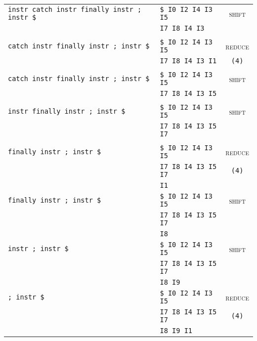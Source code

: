 \documentclass[a4paper,10pt]{article}
\begin{document}
\begin{enumerate}
\begin{enumerate}
\begin{center}
\begin{tabular}{ | l | l | c |}
                    \verb|instr catch instr finally instr ; instr $| & \verb|$ I0 I2 I4 I3 I5| & \textsc{shift} \\
                    \verb|                                          | & \verb|I7 I8 I4 I3| & \\ 
                    & & \\ \hline

                    \verb|catch instr finally instr ; instr $| & \verb|$ I0 I2 I4 I3 I5| & \textsc{reduce} \\
                    & \verb|I7 I8 I4 I3 I1| & \verb|(4)| \\ 
                    & & \\ \hline

                    \verb|catch instr finally instr ; instr $| & \verb|$ I0 I2 I4 I3 I5| & \textsc{shift} \\
                    & \verb|I7 I8 I4 I3 I5| & \\ 
                    & & \\ \hline

                    \verb|instr finally instr ; instr $| & \verb|$ I0 I2 I4 I3 I5| & \textsc{shift} \\
                    & \verb|I7 I8 I4 I3 I5 I7| & \\ 
                    & & \\ \hline

                    \verb|finally instr ; instr $| & \verb|$ I0 I2 I4 I3 I5| & \textsc{reduce} \\
                    & \verb|I7 I8 I4 I3 I5 I7| & \verb|(4)| \\
                    & \verb|I1| & \\ \hline

                    \verb|finally instr ; instr $| & \verb|$ I0 I2 I4 I3 I5| & \textsc{shift} \\
                    & \verb|I7 I8 I4 I3 I5 I7| & \\
                    & \verb|I8| & \\ \hline

                    \verb|instr ; instr $| & \verb|$ I0 I2 I4 I3 I5| & \textsc{shift} \\
                    & \verb|I7 I8 I4 I3 I5 I7| & \\
                    & \verb|I8 I9| & \\ \hline

                    \verb|; instr $| & \verb|$ I0 I2 I4 I3 I5| & \textsc{reduce} \\
                    & \verb|I7 I8 I4 I3 I5 I7| & \verb|(4)|\\
                    & \verb|I8 I9 I1| & \\ \hline


\end{tabular}
\end{center}
\end{enumerate}
\end{enumerate}
\end{document}
